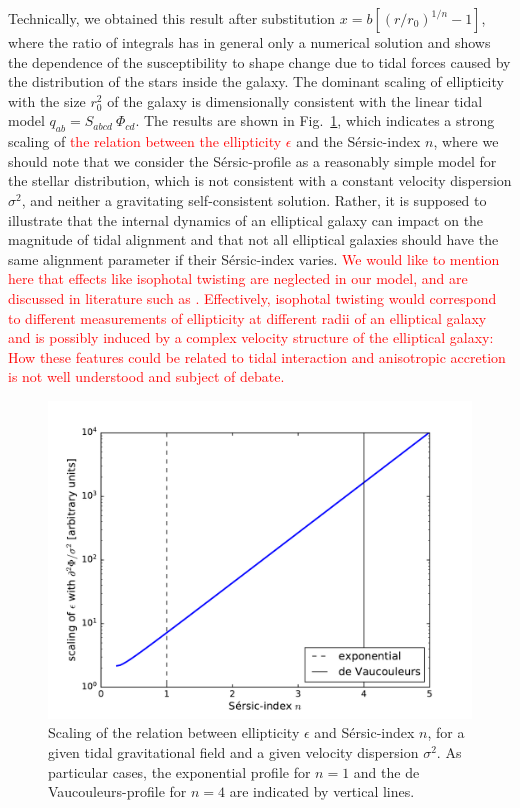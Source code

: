 \documentclass[a4paper,fleqn,usenatbib]{mnras}
\newcommand\spirou[1]{\textcolor{red}{#1}}
\newcommand\BG[1]{\textcolor{red}{#1}}
\begin{document}
Technically, we obtained this result after substitution $x = b\left[(r/r_0)^{1/n}-1\right]$, where the ratio of integrals has in general only a numerical solution and shows the dependence of the susceptibility to shape change due to tidal forces caused by the distribution of the stars inside the galaxy. The dominant scaling of ellipticity with the size $r_0^2$ of the galaxy is dimensionally consistent with the linear tidal model $q_{ab} = S_{abcd}\:\Phi_{cd}$. The results are shown in Fig.~\ref{fig_sersic_scaling}, which indicates a strong scaling of \BG{the relation between the ellipticity $\epsilon$} and the S{\'e}rsic-index $n$, where we should note that we consider the S{\'e}rsic-profile as a reasonably simple model for the stellar distribution, which is not consistent with a constant velocity dispersion $\sigma^2$, and neither a gravitating self-consistent solution. Rather, it is supposed to illustrate that the internal dynamics of an elliptical galaxy can impact on the magnitude of tidal alignment and that not all elliptical galaxies should have the same alignment parameter if their S{\'e}rsic-index varies. \spirou{We would like to mention here that effects like isophotal twisting are neglected in our model, and are discussed in literature such as \cite{Singh:2014kla}. Effectively, isophotal twisting would correspond to different measurements of ellipticity at different radii of an elliptical galaxy and is possibly induced by a complex velocity structure of the elliptical galaxy: How these features could be related to tidal interaction and anisotropic accretion is not well understood and subject of debate.}

\begin{figure}
\centering
\includegraphics[scale=0.45]{./figures/sersic_scaling.pdf}
\caption{Scaling of the relation between ellipticity $\epsilon$ and S{\'e}rsic-index $n$, for a given tidal gravitational field and a given velocity dispersion $\sigma^2$. As particular cases, the exponential profile for $n=1$ and the de Vaucouleurs-profile for $n=4$ are indicated by vertical lines.}
\label{fig_sersic_scaling}
\end{figure}
\end{document}
